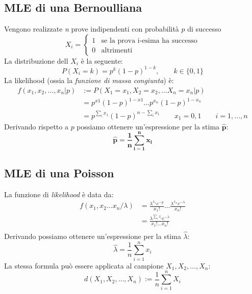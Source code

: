 \documentclass[]{article}
\begin{document}
    \subsection{MLE di una Bernoulliana}
    Vengono realizzate \textit{n} prove indipendenti con probabilità $p$ di successo
    \begin{equation*}
        X_i =
        \begin{cases}
            1 & \text{se la prova i-esima ha successo} \\
            0 & \text{altrimenti}
        \end{cases}
    \end{equation*}
    La distribuzione dell $X_i$ è la seguente:
    \[ P(X_i = k) = p^k (1-p)^{1-k}, \qquad k \in \{0,1\} \]
    La likelihood (ossia la \textit{funzione di massa congiunta}) è:
    \begin{equation*}
        \begin{split}
            f(x_1, x_2, \ldots, x_n \rvert p) &:= P(X_1 = x_1, X_2 = x_2, \ldots X_n = x_n \rvert p) \\
            &= p^{x1}(1-p)^{1-x1} \ldots p^{x_n}(1-p)^{1-x_n} \\
            &= p^{\sum_{i}^{} x_1}(1-p)^{n- \sum_{i}^{} x_1} \qquad x_1 = 0,1 \qquad i = 1, \ldots, n
        \end{split}
    \end{equation*}
    Derivando rispetto a $p$ possiamo ottenere un'espressione per la stima $\boldsymbol{\hat{p}}$:
    \[ \boldsymbol{\hat{p} = \frac{1}{n} \sum_{i = 1}^{n} x_i} \]
    \subsection{MLE di una Poisson}
    La funzione di \textit{likelihood} è data da:
    \begin{equation*}
        \begin{split}
            f(x_1, x_2 \ldots x_n / \lambda) &= \frac{\lambda^{x_1} e^{-y}}{x_1!} \ldots \frac{\lambda^{x_n} e^{-\lambda}}{x_n!} \\
            &= \frac{\lambda^{\sum_{i}^{} x_i} e^{-\lambda}}{x_1 ! \ldots x_n !} \\
        \end{split}
    \end{equation*}
    Derivando possiamo ottenere un'espressione per la stima $\hat{\lambda}$:
    \[ \hat{\lambda} = \frac{1}{n} \sum_{i = 1}^{n} x_i \]
    La stessa formula può essere applicata al campione $X_1, X_2, \ldots, X_n$:
    \[ d(X_1, X_2, \ldots, X_n) := \frac{1}{n} \sum_{i=1}^{n} X_i \]
\end{document}
